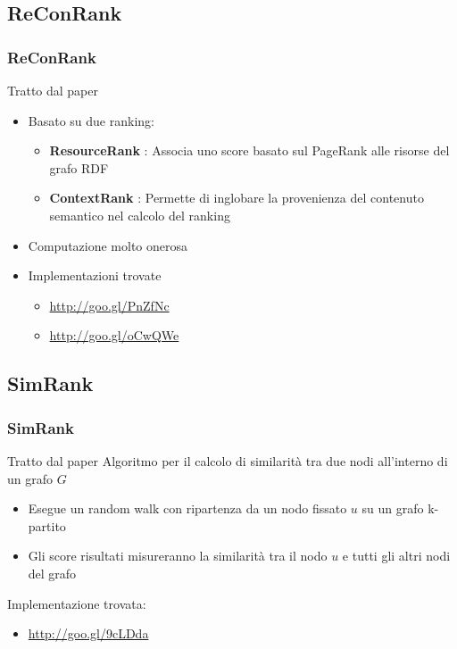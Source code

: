 \documentclass{beamer}
\begin{document}
\subsection{ReConRank}
\begin{frame}
	\frametitle{ReConRank}
	Tratto dal paper \cite{Hogan06reconrank:a}
	\begin{itemize}
	\item 	Basato su due ranking:
	\begin{itemize}
		\item \textbf{ResourceRank} : Associa uno score basato sul PageRank alle risorse del grafo RDF
		\item \textbf{ContextRank} : Permette di inglobare la provenienza del contenuto semantico nel calcolo del ranking
	\end{itemize}
	\item Computazione molto onerosa
	\item Implementazioni trovate
	\begin{itemize}
		\item \url{http://goo.gl/PnZfNc}
		\item \url{http://goo.gl/oCwQWe}
	\end{itemize}
\end{itemize}
\end{frame}

\subsection{SimRank}
\begin{frame}
	\frametitle{SimRank}
	Tratto dal paper \cite{Jeh:2002:SMS:775047.775126}
	Algoritmo per il calcolo di similarità tra due nodi all'interno di un grafo $G$
	\begin{itemize}
		\item Esegue un random walk con ripartenza da un nodo fissato $u$ su un grafo k-partito
		\item Gli score risultati misureranno la similarità tra il nodo $u$ e tutti gli altri nodi del grafo
	\end{itemize}
	Implementazione trovata:
	\begin{itemize}
		\item \url{http://goo.gl/9cLDda}
	\end{itemize}
\end{frame}
\end{document}

